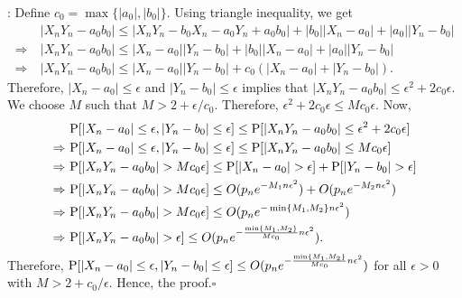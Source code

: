 \documentclass[twoside]{article}
\newcommand{\0}{\mathbf{0}}
\newcommand{\1}{\mathbf{1}}
\newcommand*{\QEDB}{\hfill\ensuremath{\square}}
\numberwithin{equation}{section}
\begin{document}
:
Define $c_0=\max\{|a_0|,|b_0|\}.$ Using triangle inequality, we get
\begin{align*}
 &\ |X_nY_n - a_0b_0|\leq |X_nY_n - b_0X_n - a_0Y_n + a_0b_0| + |b_0||X_n-a_0|+|a_0||Y_n-b_0|\\
 \Rightarrow &\ |X_nY_n - a_0b_0|\leq |X_n-a_0||Y_n - b_0| + |b_0||X_n-a_0|+|a_0||Y_n-b_0|\\
 \Rightarrow &\ |X_nY_n - a_0b_0|\leq |X_n-a_0||Y_n - b_0| + c_0(|X_n-a_0|+|Y_n-b_0|).
\end{align*}
Therefore, $|X_n-a_0|\leq \epsilon$ and $|Y_n-b_0|\leq \epsilon$ implies that $|X_nY_n - a_0b_0|\leq \epsilon^2 + 2c_0\epsilon$. We choose $M$ such that $M>2+\epsilon/c_0.$ Therefore, $\epsilon^2 + 2c_0\epsilon\leq Mc_0\epsilon.$ Now,
\begin{align*}
&\ {\rm P}[|X_n-a_0|\leq \epsilon,|Y_n-b_0|\leq \epsilon]\leq {\rm P}[|X_nY_n - a_0b_0|\leq \epsilon^2+2c_0\epsilon]\\
\Rightarrow &\ {\rm P}[|X_n-a_0|\leq \epsilon,|Y_n-b_0|\leq \epsilon]\leq {\rm P}[|X_nY_n - a_0b_0|\leq Mc_0 \epsilon]\\
\Rightarrow &\ {\rm P}[|X_nY_n - a_0b_0|>Mc_0 \epsilon]\leq {\rm P}[|X_n-a_0|> \epsilon] + {\rm P}[|Y_n-b_0|> \epsilon]\\
\Rightarrow &\ {\rm P}[|X_nY_n - a_0b_0|>Mc_0 \epsilon]\leq O(p_n e^{- M_1 n \epsilon^2}) + O(p_n e^{-M_2 n \epsilon^2})\\
\Rightarrow &\ {\rm P}[|X_nY_n - a_0b_0|>Mc_0 \epsilon]\leq O(p_n e^{-\min\{M_1,M_2\} n \epsilon^2})\\
\Rightarrow &\ {\rm P}[|X_nY_n - a_0b_0|>\epsilon]\leq O(p_n e^{-\frac{\min\{M_1,M_2\}}{Mc_0} n \epsilon^2}).
\end{align*}
Therefore, ${\rm P}[|X_n-a_0|\leq \epsilon,|Y_n-b_0|\leq \epsilon]\leq O(p_n e^{-\frac{\min\{M_1,M_2\}}{Mc_0} n \epsilon^2})$ for all $\epsilon>0$ with $M>2+c_0/\epsilon.$ Hence, the proof.\hfill\QEDB\newline
\end{document}
